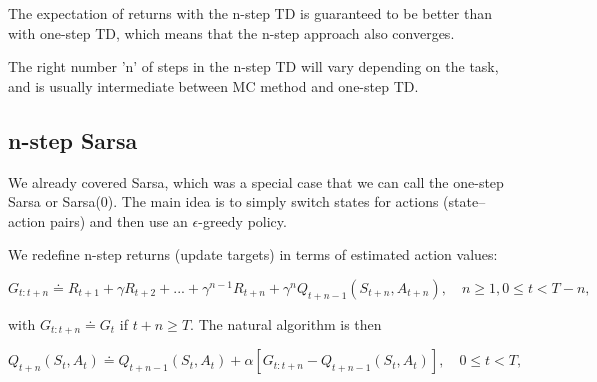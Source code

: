 \documentclass[11pt]{article}
\begin{document}
The expectation of returns with the n-step TD is guaranteed to be better than
with one-step TD, which means that the n-step approach also converges.

The right number 'n' of steps in the n-step TD will vary depending on the task,
and is usually intermediate between MC method and one-step TD.

\subsection{n-step Sarsa}
\label{sec:orgbbad391}

We already covered Sarsa, which was a special case that we can call the one-step
Sarsa or Sarsa(0). The main idea is to simply switch states for actions
(state–action pairs) and then use an \(\epsilon\)-greedy policy.

We redefine n-step returns (update targets) in terms of estimated action values:

\begin{equation}
G_{t:t+n} \doteq R_{t+1} + \gamma R_{t+2} + {...} + \gamma^{n-1} R_{t+n} + \gamma^{n} Q_{t+n-1}(S_{t+n}, A_{t+n}), \quad n \geq 1, 0 \leq t < T-n,
\end{equation}

with \(G_{t:t+n} \doteq G_t\) if \(t + n \geq T\). The natural algorithm is then

\begin{equation}
Q_{t+n}(S_t, A_t) \doteq Q_{t+n-1}(S_t, A_t) + \alpha [G_{t:t+n} - Q_{t+n-1}(S_t, A_t)], \quad 0 \leq t < T,
\end{equation}
\end{document}
